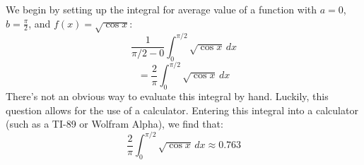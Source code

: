 \begin{Answer}[ref = func_avg]
We begin by setting up the integral for average value of a function with $a = 
0$, $b = \frac{\pi}{2}$, and $f(x) = \sqrt{\cos{x}}$:
$$\frac{1}{\pi / 2 - 0} \int_0^{\pi / 2} \sqrt{\cos{x}}\,dx$$
$$= \frac{2}{\pi} \int_0^{\pi/2} \sqrt{\cos{x}}\,dx$$
There's not an obvious way to evaluate this integral by hand. Luckily, this 
question allows for the use of a calculator. Entering this integral into a 
calculator (such as a TI-89 or Wolfram Alpha), we find that:
$$\frac{2}{\pi} \int_0^{\pi/2} \sqrt{\cos{x}}\,dx \approx 0.763 $$
\end{Answer}
